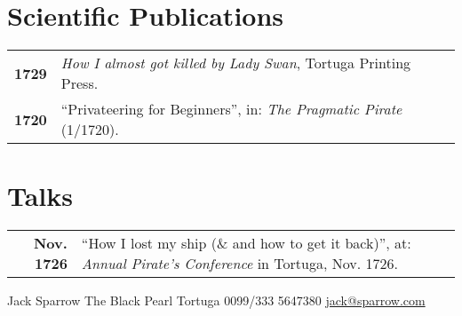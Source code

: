 \documentclass[lighthipster]{simplehipstercv}
\newlength{\rightcolwidth}
\begin{document}
\begin{paracol}{2}
\begin{minipage}[t]{0.3\textwidth}
\end{minipage}\hfill
\begin{minipage}[t]{0.3\textwidth}
\section*{Scientific Publications}
\begin{tabular}{>{\footnotesize\bfseries}r >{\footnotesize}p{}}
    1729 & \emph{How I almost got killed by Lady Swan}, Tortuga Printing Press. \\
    1720 & ``Privateering for Beginners'', in: \emph{The Pragmatic Pirate} (1/1720).
\end{tabular}
\bigskip

\section*{Talks}
\begin{tabular}{>{\footnotesize\bfseries}r >{\footnotesize}p{}}
    Nov. 1726 & ``How I lost my ship (\& and how to get it back)'', at: \emph{Annual Pirate's Conference} in Tortuga, Nov. 1726.
\end{tabular}
\end{minipage}






\vfill{} %

\setlength{\parindent}{0pt}
\begin{minipage}[t]{\rightcolwidth}
\begin{center}\fontfamily{\sfdefault}\selectfont \color{black!70}
{\small Jack Sparrow  The Black Pearl  Tortuga  0099/333 5647380 \newline{} \protect\url{jack@sparrow.com}
}
\end{center}
\end{minipage}

\end{paracol}
\end{document}
